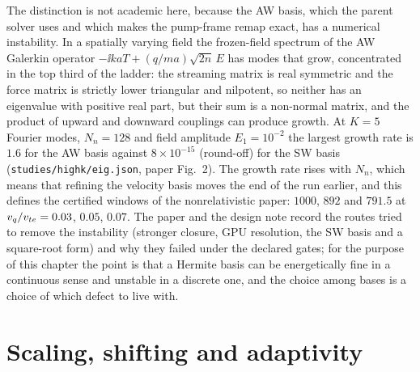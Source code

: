 The distinction is not academic here, because the AW basis, which the parent solver uses and which makes the pump-frame remap exact, has a numerical instability. In a spatially varying field the frozen-field spectrum of the AW Galerkin operator $-\ii kaT+(q/ma)\sqrt{2n}\,E$ has modes that grow, concentrated in the top third of the ladder: the streaming matrix is real symmetric and the force matrix is strictly lower triangular and nilpotent, so neither has an eigenvalue with positive real part, but their sum is a non-normal matrix, and the product of upward and downward couplings can produce growth. At $K=5$ Fourier modes, $N_n=128$ and field amplitude $E_1=10^{-2}$ the largest growth rate is $1.6$ for the AW basis against $8\times10^{-15}$ (round-off) for the SW basis (\texttt{studies/highk/eig.json}, paper Fig.~2). The growth rate rises with $N_n$, which means that refining the velocity basis moves the end of the run earlier, and this defines the certified windows of the nonrelativistic paper: $1000$, $892$ and $791.5$ at $v_q/v_{te}=0.03$, $0.05$, $0.07$. The paper and the design note record the routes tried to remove the instability (stronger closure, GPU resolution, the SW basis and a square-root form) and why they failed under the declared gates; for the purpose of this chapter the point is that a Hermite basis can be energetically fine in a continuous sense and unstable in a discrete one, and the choice among bases is a choice of which defect to live with.

\section{Scaling, shifting and adaptivity}\label{sec:scaling}

